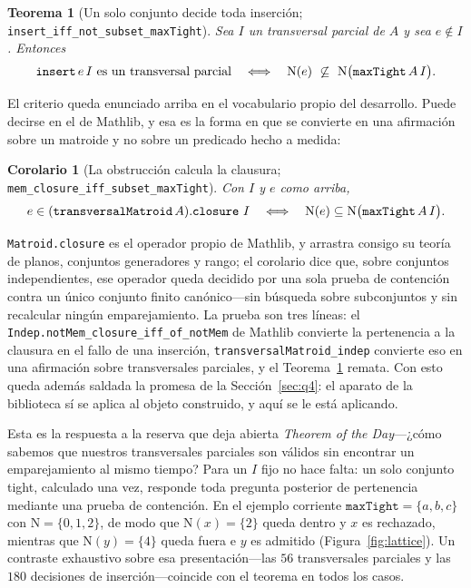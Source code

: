 \documentclass[11pt]{article}
\newtheorem{theorem}{Teorema}
\newtheorem{corollary}{Corolario}
\newcommand{\lean}[1]{\texttt{#1}}
\newcommand{\N}{\mathrm{N}}
\begin{document}
\begin{theorem}[Un solo conjunto decide toda inserción; \lean{insert\_iff\_not\_subset\_maxTight}]
\label{thm:canonical}
Sea $I$ un transversal parcial de $A$ y sea $e\notin I$. Entonces
\[
  \textnormal{\lean{insert}}\,e\,I \ \textnormal{es un transversal parcial}
  \quad\Longleftrightarrow\quad
  \N(e)\ \not\subseteq\ \N\bigl(\textnormal{\lean{maxTight}}\,A\,I\bigr).
\]
\end{theorem}

\noindent El criterio queda enunciado arriba en el vocabulario propio del desarrollo. Puede decirse
en el de Mathlib, y esa es la forma en que se convierte en una afirmación sobre un matroide y no
sobre un predicado hecho a medida:

\begin{corollary}[La obstrucción calcula la clausura; \lean{mem\_closure\_iff\_subset\_maxTight}]
\label{cor:closure}
Con $I$ y $e$ como arriba,
\[
  e\in(\textnormal{\lean{transversalMatroid}}\,A).\textnormal{\lean{closure}}\ I
  \quad\Longleftrightarrow\quad
  \N(e)\subseteq\N\bigl(\textnormal{\lean{maxTight}}\,A\,I\bigr).
\]
\end{corollary}

\noindent \lean{Matroid.closure} es el operador propio de Mathlib, y arrastra consigo su teoría de
planos, conjuntos generadores y rango; el corolario dice que, sobre conjuntos independientes, ese
operador queda decidido por una sola
prueba de contención contra un único conjunto finito canónico---sin búsqueda sobre subconjuntos y
sin recalcular ningún emparejamiento. La prueba son tres líneas: el
\lean{Indep.notMem\_closure\_iff\_of\_notMem} de Mathlib convierte la pertenencia a la clausura en
el fallo de una inserción, \lean{transversalMatroid\_indep} convierte eso en una afirmación sobre
transversales parciales, y el Teorema~\ref{thm:canonical} remata. Con esto queda además saldada la
promesa de la Sección~\ref{sec:q4}: el aparato de la biblioteca sí se aplica al objeto construido, y
aquí se le está aplicando.

Esta es la respuesta a la reserva que deja abierta \emph{Theorem of the Day}---¿cómo sabemos que
nuestros transversales parciales son válidos sin encontrar un emparejamiento al mismo tiempo? Para
un $I$ fijo no hace falta: un solo conjunto tight, calculado una vez, responde toda pregunta
posterior de pertenencia mediante una prueba de contención. En el ejemplo corriente
$\lean{maxTight}=\{a,b,c\}$ con $\N=\{0,1,2\}$, de modo que $\N(x)=\{2\}$ queda dentro y $x$ es
rechazado, mientras que $\N(y)=\{4\}$ queda fuera e $y$ es admitido (Figura~\ref{fig:lattice}). Un
contraste exhaustivo sobre esa presentación---las $56$ transversales parciales y las $180$
decisiones de inserción---coincide con el teorema en todos los casos.
\end{document}

